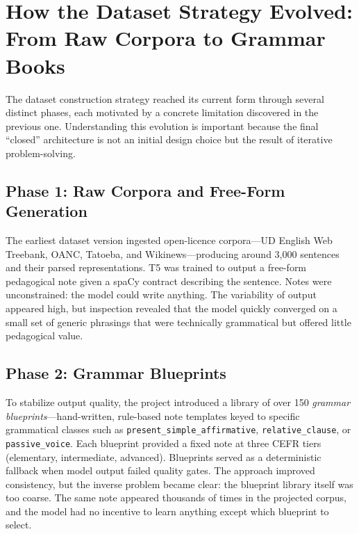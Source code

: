 \documentclass[12pt,a4paper,oneside]{report}
\begin{document}
\section{How the Dataset Strategy Evolved: From Raw Corpora to Grammar Books}
\label{sec:closed-pipeline}
The dataset construction strategy reached its current form through several distinct phases, each motivated by a concrete limitation discovered in the previous one. Understanding this evolution is important because the final ``closed'' architecture is not an initial design choice but the result of iterative problem-solving.

\subsection*{Phase 1: Raw Corpora and Free-Form Generation}
The earliest dataset version ingested open-licence corpora---UD English Web Treebank, OANC, Tatoeba, and Wikinews---producing around 3,000 sentences and their parsed representations. T5 was trained to output a free-form pedagogical note given a spaCy contract describing the sentence. Notes were unconstrained: the model could write anything. The variability of output appeared high, but inspection revealed that the model quickly converged on a small set of generic phrasings that were technically grammatical but offered little pedagogical value.

\subsection*{Phase 2: Grammar Blueprints}
To stabilize output quality, the project introduced a library of over 150 \emph{grammar blueprints}---hand-written, rule-based note templates keyed to specific grammatical classes such as \texttt{present\_simple\_affirmative}, \texttt{relative\_clause}, or \texttt{passive\_voice}. Each blueprint provided a fixed note at three CEFR tiers (elementary, intermediate, advanced). Blueprints served as a deterministic fallback when model output failed quality gates. The approach improved consistency, but the inverse problem became clear: the blueprint library itself was too coarse. The same note appeared thousands of times in the projected corpus, and the model had no incentive to learn anything except which blueprint to select.
\end{document}
